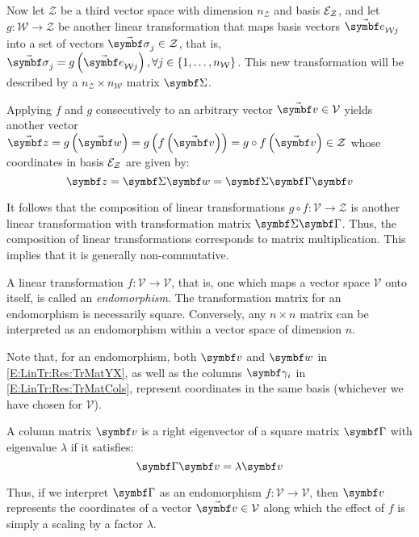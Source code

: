 Now let $\mathcal{Z}$ be a third vector space with dimension $n_{\mathcal{Z}}$ and basis $\basis[\mathcal{Z}]$, and let $g:\mathcal{W}\rightarrow\mathcal{Z}$ be another linear transformation that maps basis vectors $\vasub{\bv}{\mathcal{W} j}$ into a set of vectors $\vasub{\sigma}{j}\in\mathcal{Z}$, that is,  $\vasub{\sigma}{j}=g\rndp{\vasub{\bv}{\mathcal{W} j}}, \forall j \in\left\{1,\dots, n_{\mathcal{W}}\right\}$. This new transformation will be described by a $n_{\mathcal{Z}} \times n_{\mathcal{W}}$ matrix $\mat{\Sigma}$.

Applying $f$ and $g$ consecutively to an arbitrary vector $\vabs{v} \in \mathcal{V}$ yields another vector $\vabs{z}=g\left(\vabs{w}\right)=g\left(f\left(\vabs{v}\right)\right)=g \circ f\left(\vabs{v}\right) \in \mathcal{Z}$ whose coordinates in basis $\basis[\mathcal{Z}]$ are given by:
\begin{equation} \label{E:LinTr:Res:TrMatZX}
\mcol{z}=\mat{\Sigma} \mcol{w} =\mat{\Sigma} \mat{\Gamma} \mcol{v}
\end{equation}

It follows that the composition of linear transformations $g \circ f:\mathcal{V}\rightarrow\mathcal{Z}$ is another linear transformation with transformation matrix $\mat{\Sigma}\mat{\Gamma}$. Thus, the composition of linear transformations corresponds to matrix multiplication. This implies that it is generally non-commutative.

A linear transformation $f:\mathcal{V}\rightarrow\mathcal{V}$, that is, one which  maps a vector space $\mathcal{V}$ onto itself, is called an \emph{endomorphism}. The transformation matrix for an endomorphism is necessarily square. Conversely, any $n \times n$ matrix can be interpreted as an endomorphism within a vector space of dimension $n$.

Note that, for an endomorphism, both $\mcol{v}$ and $\mcol{w}$ in \eqref{E:LinTr:Res:TrMatYX}, as well as the columns $\mcol{\gamma}_i$ in \eqref{E:LinTr:Res:TrMatCols}, represent coordinates in the same basis (whichever we have chosen for $\mathcal{V}$).

A column matrix $\mcol{v}$ is a right eigenvector of a square matrix $\mat{\Gamma}$ with eigenvalue $\lambda$ if it satisfies:
\begin{equation} \label{E:LinTr:Res:Eigen}
\mat{\Gamma} \mcol{v}=\lambda \mcol{v}
\end{equation}

Thus, if we interpret $\mat{\Gamma}$ as an endomorphism $f:\mathcal{V}\rightarrow\mathcal{V}$, then $\mcol{v}$ represents the coordinates of a vector $\vabs{v} \in \mathcal{V}$ along which the effect of $f$ is simply a scaling by a factor $\lambda$.


